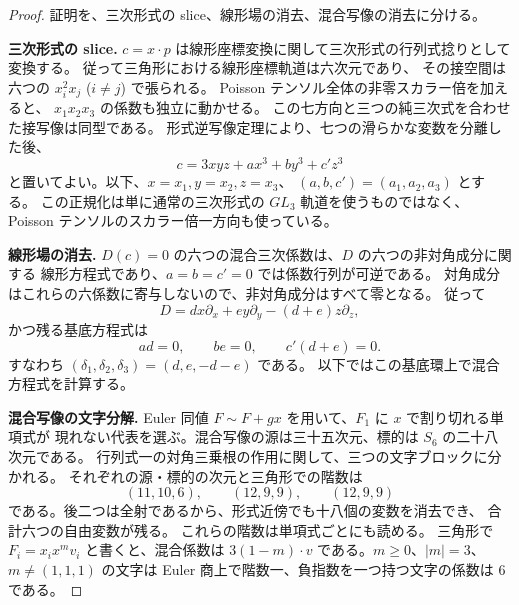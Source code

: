 \begin{proof}
証明を、三次形式の slice、線形場の消去、混合写像の消去に分ける。

\smallskip\noindent
\textbf{三次形式の slice.}
$c=x\cdot p$ は線形座標変換に関して三次形式の行列式捻りとして変換する。
従って三角形における線形座標軌道は六次元であり、
その接空間は六つの $x_i^2x_j$ ($i\ne j$) で張られる。
Poisson テンソル全体の非零スカラー倍を加えると、
$x_1x_2x_3$ の係数も独立に動かせる。
この七方向と三つの純三次式を合わせた接写像は同型である。
形式逆写像定理により、七つの滑らかな変数を分離した後、
\[
 c=3xyz+a x^3+b y^3+c' z^3
 \tag{\(\ast\)}\label{eq:triangle-cubic-slice-v32}
\]
と置いてよい。以下、$x=x_1,y=x_2,z=x_3$、
$(a,b,c')=(a_1,a_2,a_3)$ とする。
この正規化は単に通常の三次形式の $GL_3$ 軌道を使うものではなく、
Poisson テンソルのスカラー倍一方向も使っている。

\smallskip\noindent
\textbf{線形場の消去.}
$D(c)=0$ の六つの混合三次係数は、$D$ の六つの非対角成分に関する
線形方程式であり、$a=b=c'=0$ では係数行列が可逆である。
対角成分はこれらの六係数に寄与しないので、非対角成分はすべて零となる。
従って
\[
 D=d x\partial_x+e y\partial_y-(d+e)z\partial_z,
\]
かつ残る基底方程式は
\[
 ad=0,\qquad be=0,\qquad c'(d+e)=0.
 \tag{\(\ast\ast\)}\label{eq:triangle-base-v32}
\]
すなわち $(\delta_1,\delta_2,\delta_3)=(d,e,-d-e)$ である。
以下ではこの基底環上で混合方程式を計算する。

\smallskip\noindent
\textbf{混合写像の文字分解.}
Euler 同値 $F\sim F+gx$ を用いて、$F_1$ に $x$ で割り切れる単項式が
現れない代表を選ぶ。混合写像の源は三十五次元、標的は $S_6$ の二十八次元である。
行列式一の対角三乗根の作用に関して、三つの文字ブロックに分かれる。
それぞれの源・標的の次元と三角形での階数は
\[
 (11,10,6),\qquad(12,9,9),\qquad(12,9,9)
\]
である。後二つは全射であるから、形式近傍でも十八個の変数を消去でき、
合計六つの自由変数が残る。
これらの階数は単項式ごとにも読める。
三角形で $F_i=x_ix^m v_i$ と書くと、混合係数は
$3(1-m)\cdot v$ である。$m\geq0$、$|m|=3$、$m\ne(1,1,1)$ の文字は
Euler 商上で階数一、負指数を一つ持つ文字の係数は $6$ である。


\end{proof}

